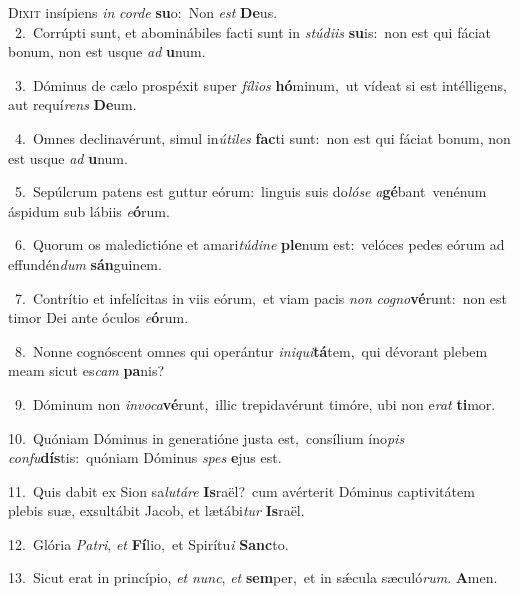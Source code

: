 \lettrine{\initial\textcolor{\initialcolor}{D}}{ixit} insípiens \textit{in} \textit{cor}\-\textit{de} \textbf{su}\-o:~\star Non \textit{est} \textbf{De}\-us.\\
{\numbfont\textcolor{\numbcolor}{~2.}}~Corrúpti sunt, et abominábiles facti sunt in \textit{stú}\-\textit{di}\textit{is} \textbf{su}\-is:~\star non est qui fáciat bonum, non est usque \textit{ad} \textbf{u}\-num.\par
{\numbfont\textcolor{\numbcolor}{~3.}}~Dóminus de cælo prospéxit super \textit{fí}\-\textit{li}\textit{os} \textbf{hó}\-minum,~\star ut vídeat si est intélligens, aut requí\textit{rens} \textbf{De}\-um.\par
{\numbfont\textcolor{\numbcolor}{~4.}}~Omnes declinavérunt, simul in\-\textit{ú}\-\textit{ti}\textit{les} \textbf{fac}\-ti sunt:~\star non est qui fáciat bonum, non est usque \textit{ad} \textbf{u}\-num.\par
{\numbfont\textcolor{\numbcolor}{~5.}}~Sepúlcrum patens est guttur eórum:~\dagger linguis suis do\-\textit{ló}\-\textit{se} \textit{a}\-\textbf{gé}bant~\star venénum áspidum sub lábiis \textit{e}\-\textbf{ó}rum.\par
{\numbfont\textcolor{\numbcolor}{~6.}}~Quorum os maledictióne et amari\-\textit{tú}\-\textit{di}\textit{ne} \textbf{ple}\-num est:~\star velóces pedes eórum ad effundén\textit{dum} \textbf{sán}\-guinem.\par
{\numbfont\textcolor{\numbcolor}{~7.}}~Contrítio et infelícitas in viis eórum,~\dagger et viam pacis \textit{non} \textit{co}\-\textit{gno}\textbf{vé}runt:~\star non est timor Dei ante óculos \textit{e}\-\textbf{ó}rum.\par
{\numbfont\textcolor{\numbcolor}{~8.}}~Nonne cognóscent omnes qui operántur \textit{in}\-\textit{i}\textit{qui}\textbf{tá}tem,~\star qui dévorant plebem meam sicut es\textit{cam} \textbf{pa}\-nis?\par
{\numbfont\textcolor{\numbcolor}{~9.}}~Dóminum non \textit{in}\-\textit{vo}\textit{ca}\textbf{vé}runt,~\star illic trepidavérunt timóre, ubi non e\textit{rat} \textbf{ti}\-mor.\par
{\numbfont\textcolor{\numbcolor}{10.}}~Quóniam Dóminus in generatióne justa est,~\dagger consílium íno\textit{pis} \textit{con}\-\textit{fu}\textbf{dís}tis:~\star quóniam Dóminus \textit{spes} \textbf{e}\-jus est.\par
{\numbfont\textcolor{\numbcolor}{11.}}~Quis dabit ex Sion sa\-\textit{lu}\-\textit{tá}\textit{re} \textbf{Is}\-raël?~\star cum avérterit Dóminus captivitátem plebis suæ, exsultábit Jacob, et lætábi\textit{tur} \textbf{Is}\-raël.\par
{\numbfont\textcolor{\numbcolor}{12.}}~Glória \textit{Pa}\-\textit{tri}, \textit{et} \textbf{Fí}\-lio,~\star et Spirítu\textit{i} \textbf{Sanc}\-to.\par
{\numbfont\textcolor{\numbcolor}{13.}}~Sicut erat in princípio, \textit{et} \textit{nunc}\-, \textit{et} \textbf{sem}\-per,~\star et in sǽcula sæculó\-\textit{rum}\-. \textbf{A}\-men.\par
